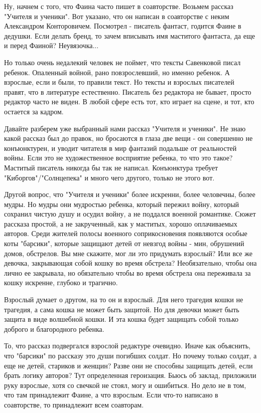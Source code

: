 Ну, начнем с того, что Фаина часто пишет в соавторстве. Возьмем рассказ
"Учителя и ученики". Вот указано, что он написан в соавторстве с неким
Александром Конторовичем.  Посмотрел - писатель фантаст, годится Фаине в
дедушки. Если делать бренд, то зачем вписывать имя маститого фантаста, да еще и
перед Фаиной?  Неувязочка...

Но только очень недалекий человек не поймет, что тексты Савенковой писал
ребенок. Опаленный войной, рано повзрослевший, но именно ребенок. А взрослые,
если и были, то правили текст. Но тексты и взрослых писателей правят, что в
литературе естественно. Писатель без редактора не бывает, просто редактор часто
не виден. В любой сфере есть тот, кто играет на сцене, и тот, кто остается за
кадром. 

Давайте разберем уже выбранный нами рассказ "Учителя и ученики". Не знаю какой
рассказ был до правок, но бросаются в глаза две вещи - он совершенно не
конъюнктурен, и уводит читателя в мир фантазий подальше от реальностей войны.
Если это не художественное восприятие ребенка, то что это такое? Маститый
писатель никогда бы так не написал. Конъюнктура требует "Киборгов"/"Солнцепека"
и много чего другого, только не этого вот. 

Другой вопрос, что "Учителя и ученики" более искренни, более человечны, более
мудры. Но мудры они мудростью ребенка, который пережил войну, который сохранил
чистую душу и осудил войну, а не поддался военной романтике. Сюжет рассказа
простой, а не закрученный, как у маститых, хорошо оплачиваемых авторов. Среди
жителей полосы военного соприкосновения появляются особые коты "барсики",
которые защищают детей от невзгод войны - мин, обрушений домов, обстрелов. Вы
мне скажите, мог ли это придумать взрослый? Или все же девочка, закрывающая
собой кошку во время обстрела? Необязательно, чтобы она лично ее закрывала, но
обязательно чтобы во время обстрела она переживала за кошку искренне, глубоко и
трагично. 

Взрослый думает о другом, на то он и взрослый. Для него трагедия кошки не
трагедия, а сама кошка не может быть защитой. Но для девочки может быть защита
в виде волшебной кошки. И эта кошка будет защищать собой только доброго и
благородного ребенка. 

То, что рассказ подвергался взрослой редактуре очевидно. Иначе как объяснить,
что "барсики" по рассказу это души погибших солдат. Но почему только солдат, а
еще не детей, стариков и женщин? Разве они не способны защищать детей, если
брать логику авторов? Тут определенная героизация. Бьюсь об заклад, приложили
руку взрослые, хотя со свечкой не стоял, могу и ошибиться. Но дело не в том,
что там принадлежит Фаине, а что взрослым. Если что-то написано в соавторстве,
то принадлежит всем соавторам. 

